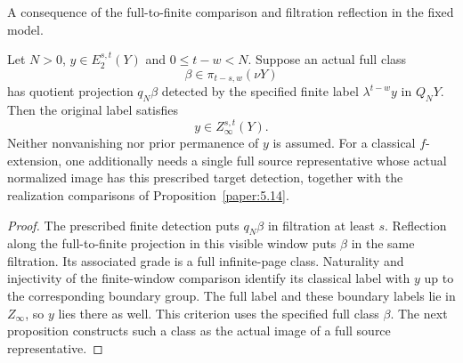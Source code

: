 \begin{theorem}
\label{sem:ProofTools:ss-full-lift-permanence}
A consequence of the full-to-finite comparison and filtration
reflection in the fixed model.

Let $N>0$, $y\in E_2^{s,t}(Y)$ and $0\le t-w<N$. Suppose an actual
full class
\[
\beta\in\pi_{t-s,w}(\nu Y)
\]
has quotient projection $q_N\beta$ detected by the specified finite
label $\lambda^{t-w}y$ in $Q_NY$. Then the original label satisfies
\[
y\in Z_\infty^{s,t}(Y).
\]
Neither nonvanishing nor prior permanence of $y$ is assumed. For a
classical $f$-extension, one additionally needs a single full source
representative whose actual normalized image has this prescribed
target detection, together with the realization comparisons of
Proposition~\ref{paper:5.14}.
\end{theorem}
\begin{proof}
The prescribed finite detection puts $q_N\beta$ in filtration at
least $s$. Reflection along the full-to-finite projection in this
visible window puts $\beta$ in the same filtration. Its associated
grade is a full infinite-page class. Naturality and injectivity of
the finite-window comparison identify its classical label with $y$
up to the corresponding boundary group. The full label and these
boundary labels lie in $Z_\infty$, so $y$ lies there as well.
This criterion uses the specified full class $\beta$. The next
proposition constructs such a class as the actual image of a full
source representative.
\end{proof}

